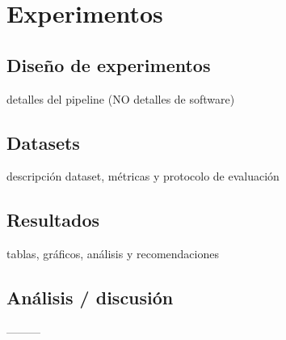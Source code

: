 \newpage

\section{Experimentos}
\subsection{Diseño de experimentos}
detalles del pipeline (NO detalles de software)
\subsection{Datasets}
descripción dataset, métricas y protocolo de evaluación
\subsection{Resultados}
tablas, gráficos, análisis y recomendaciones
\subsection{Análisis / discusión}
---------
	

	

	

	